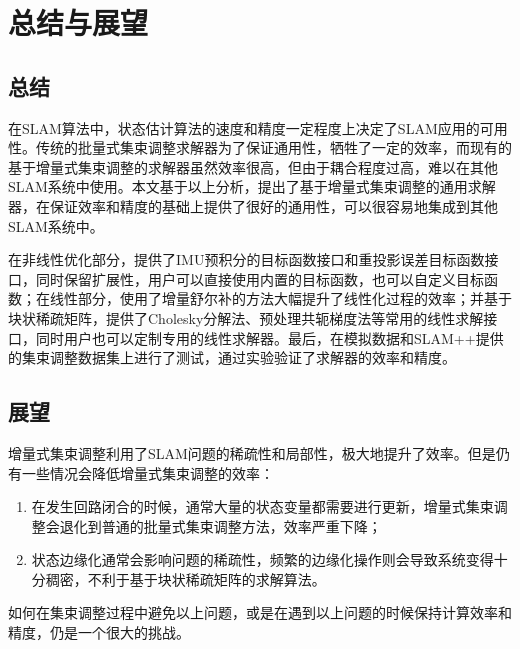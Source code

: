 \chapter{总结与展望}\label{ch:con}

\section{总结}

在SLAM算法中，状态估计算法的速度和精度一定程度上决定了SLAM应用的可用性。传统的批量式集束调整求解器为了保证通用性，牺牲了一定的效率，而现有的基于增量式集束调整的求解器虽然效率很高，但由于耦合程度过高，难以在其他SLAM系统中使用。本文基于以上分析，提出了基于增量式集束调整的通用求解器，在保证效率和精度的基础上提供了很好的通用性，可以很容易地集成到其他SLAM系统中。

在非线性优化部分，提供了IMU预积分的目标函数接口和重投影误差目标函数接口，同时保留扩展性，用户可以直接使用内置的目标函数，也可以自定义目标函数；在线性部分，使用了增量舒尔补的方法大幅提升了线性化过程的效率；并基于块状稀疏矩阵，提供了Cholesky分解法、预处理共轭梯度法等常用的线性求解接口，同时用户也可以定制专用的线性求解器。最后，在模拟数据和SLAM++提供的集束调整数据集上进行了测试，通过实验验证了求解器的效率和精度。

\section{展望}

增量式集束调整利用了SLAM问题的稀疏性和局部性，极大地提升了效率。但是仍有一些情况会降低增量式集束调整的效率：
\begin{enumerate}
    \item 在发生回路闭合的时候，通常大量的状态变量都需要进行更新，增量式集束调整会退化到普通的批量式集束调整方法，效率严重下降；
    \item 状态边缘化通常会影响问题的稀疏性，频繁的边缘化操作则会导致系统变得十分稠密，不利于基于块状稀疏矩阵的求解算法。
\end{enumerate}
如何在集束调整过程中避免以上问题，或是在遇到以上问题的时候保持计算效率和精度，仍是一个很大的挑战。
